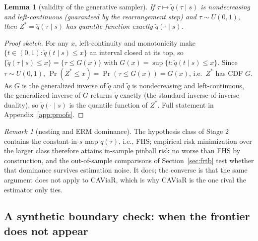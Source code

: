 \documentclass[11pt]{article}
\newtheorem{lemma}{Lemma}
\theoremstyle{remark}
\newtheorem{remark}{Remark}
\begin{document}
\begin{lemma}[validity of the generative sampler]\label{lem:sampler}
If $\tau \mapsto \widetilde{q}(\tau \mid s)$ is nondecreasing and
left-continuous (guaranteed by the rearrangement step) and
$\tau \sim U(0,1)$, then $Z^* = \widetilde{q}(\tau \mid s)$ has
quantile function exactly $\widetilde{q}(\cdot \mid s)$.
\end{lemma}
\begin{proof}[Proof sketch]
For any $x$, left-continuity and monotonicity make
$\{t\in(0,1):\widetilde{q}(t\mid s)\le x\}$ an interval closed at its
top, so $\{\widetilde q(\tau\mid s)\le x\}=\{\tau\le G(x)\}$ with
$G(x)=\sup\{t:\widetilde q(t\mid s)\le x\}$. Since $\tau\sim U(0,1)$,
$\Pr(Z^*\le x)=\Pr(\tau\le G(x))=G(x)$, i.e.\ $Z^*$ has CDF $G$. As $G$
is the generalized inverse of $\widetilde q$ and $\widetilde q$ is
nondecreasing and left-continuous, the generalized inverse of $G$
returns $\widetilde q$ exactly (the standard inverse-of-inverse
duality), so $\widetilde q(\cdot\mid s)$ is the quantile function of
$Z^*$. Full statement in Appendix~\ref{app:proofs}.
\end{proof}

\begin{remark}[nesting and ERM dominance]\label{rem:nesting}
The hypothesis class of Stage 2 contains the constant-in-$s$ map
$q(\tau)$, i.e., FHS; empirical risk minimization over the larger class
therefore attains in-sample pinball risk no worse than FHS by
construction, and the out-of-sample comparisons of
Section~\ref{sec:frtb} test whether that dominance survives estimation
noise. It does; the converse is that the same argument does
not apply to CAViaR, which is why CAViaR is the one rival the
estimator only ties.
\end{remark}

\subsection{A synthetic boundary check: when the frontier does
not appear}\label{sec:toy}
\end{document}
